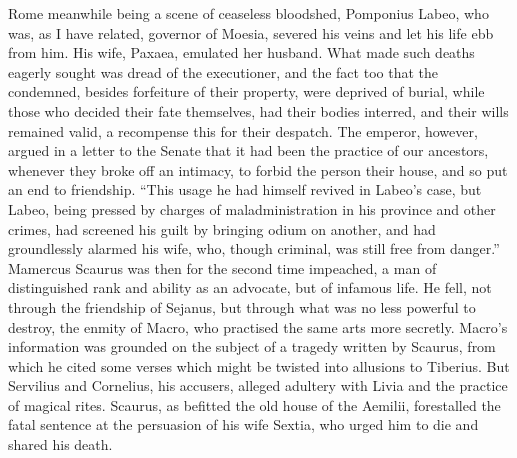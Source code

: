 Rome meanwhile being a scene of ceaseless bloodshed, Pomponius Labeo, who was, as I have related, governor of Moesia, severed his veins and let his life ebb from him. His wife, Paxaea, emulated her husband. What made such deaths eagerly sought was dread of the executioner, and the fact too that the condemned, besides forfeiture of their property, were deprived of burial, while those who decided their fate themselves, had their bodies interred, and their wills remained valid, a recompense this for their despatch. The emperor, however, argued in a letter to the Senate that it had been the practice of our ancestors, whenever they broke off an intimacy, to forbid the person their house, and so put an end to friendship. ``This usage he had himself revived in Labeo's case, but Labeo, being pressed by charges of maladministration in his province and other crimes, had screened his guilt by bringing odium on another, and had groundlessly alarmed his wife, who, though criminal, was still free from danger.'' Mamercus Scaurus was then for the second time impeached, a man of distinguished rank and ability as an advocate, but of infamous life. He fell, not through the friendship of Sejanus, but through what was no less powerful to destroy, the enmity of Macro, who practised the same arts more secretly. Macro's information was grounded on the subject of a tragedy written by Scaurus, from which he cited some verses which might be twisted into allusions to Tiberius. But Servilius and Cornelius, his accusers, alleged adultery with Livia and the practice of magical rites. Scaurus, as befitted the old house of the Aemilii, forestalled the fatal sentence at the persuasion of his wife Sextia, who urged him to die and shared his death.


